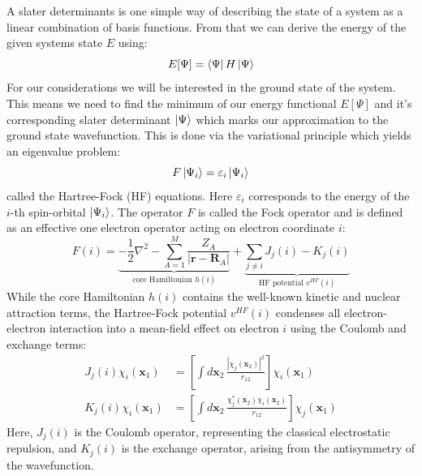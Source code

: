 A slater determinants is one simple way of describing the state of a system as a linear combination of basis functions. From that we can derive the energy of the given systems state $E$ using: 
\begin{equation}
    \label{eq:elec_energy}
    E[\Psi] = \bra{\Psi} H \ket{\Psi}
\end{equation}
For our considerations we will be interested in the ground state of the system. This means we need to find the minimum of our energy functional $E[\Psi]$ and it's corresponding slater determinant $\ket{\Psi}$ which marks our approximation to the ground state wavefunction. This is done via the variational principle which yields an eigenvalue problem: 
\begin{equation}
    \label{eq:hf_eigenval_equation}
    F \ket{\Psi_i} = \varepsilon_i \ket{\Psi_i}
\end{equation}
called the Hartree-Fock (HF) equations. Here $\varepsilon_i$ corresponds to the energy of the $i$-th spin-orbital $\ket{\Psi_i}$. The operator $F$ is called the Fock operator and is defined as an effective one electron operator acting on electron coordinate $i$:
\begin{equation}
    F(i) = 
    \underbrace{
        -\frac{1}{2} \nabla^2 
        - \sum_{A=1}^M \frac{Z_A}{|\mathbf{r} - \mathbf{R}_A|}
    }_{\text{core Hamiltonian } h(i)}
    + 
    \underbrace{
        \sum_{j\neq i} J_j(i) - K_j(i)
    }_{\text{HF potential }v^{HF}(i)}
\end{equation}
While the core Hamiltonian $h(i)$ contains the well-known kinetic and nuclear attraction terms, the Hartree-Fock potential $v^{HF}(i)$ condenses all electron-electron interaction into a mean-field effect on electron $i$ using the Coulomb and exchange terms:
\begin{subequations}
\begin{align}
    J_j(i)\chi_i(\mathbf{x}_1) &= \left[ \int d\mathbf{x}_2\, \frac{|\chi_j(\mathbf{x}_2)|^2}{r_{12}} \right] \chi_i(\mathbf{x}_1) \\
    K_j(i)\chi_i(\mathbf{x}_1) &= \left[ \int d\mathbf{x}_2\, \frac{\chi_j^*(\mathbf{x}_2)\chi_i(\mathbf{x}_2)}{r_{12}} \right] \chi_j(\mathbf{x}_1)
\end{align}
\end{subequations}
Here, $J_j(i)$ is the Coulomb operator, representing the classical electrostatic repulsion, and $K_j(i)$ is the exchange operator, arising from the antisymmetry of the wavefunction.

